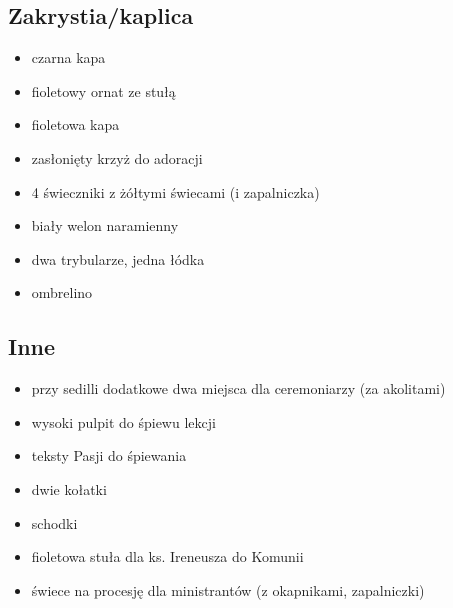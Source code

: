        \subsection{Zakrystia/kaplica}
        
            \begin{itemize}
                \item czarna kapa
                \item fioletowy ornat ze stułą
                \item fioletowa kapa
                \item zasłonięty krzyż do adoracji
                \item 4 świeczniki z żółtymi świecami (i zapalniczka)
                \item biały welon naramienny
                \item dwa trybularze, jedna łódka
                \item ombrelino
            \end{itemize}
        
        \subsection{Inne}
        
            \begin{itemize}
                \item przy sedilli dodatkowe dwa miejsca dla ceremoniarzy (za akolitami)
                \item wysoki pulpit do śpiewu lekcji
                \item teksty Pasji do śpiewania
                \item dwie kołatki
                \item schodki
                \item fioletowa stuła dla ks. Ireneusza do Komunii
                \item świece na procesję dla ministrantów (z okapnikami, zapalniczki)
            \end{itemize}
        